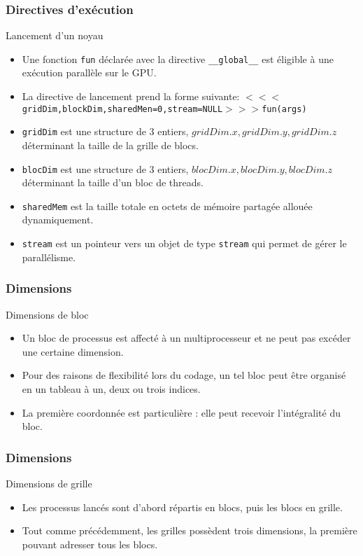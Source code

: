 \begin{frame}
    \frametitle{Directives d'exécution}
\begin{block}{Lancement d'un noyau}
    \footnotesize
    \begin{itemize}
          \item<+-> Une fonction \texttt{fun} déclarée avec la directive \texttt{\_\_global\_\_} est éligible à une exécution parallèle 
  sur le GPU.
  \item<+-> La directive de lancement prend la forme suivante:
{\footnotesize $<<<$\texttt{gridDim,blockDim,sharedMen=0,stream=NULL}$>>>$\texttt{fun(args)}}
 \item<+-> \texttt{gridDim} est une structure de 3 entiers, $gridDim.x,gridDim.y,gridDim.z$ déterminant la taille de la
 grille de blocs.
  \item<+-> \texttt{blocDim} est une structure de 3 entiers, $blocDim.x,blocDim.y,blocDim.z$ déterminant la taille d'un 
  bloc de threads.
  \item<+-> \texttt{sharedMem} est la taille totale en octets de mémoire partagée allouée dynamiquement. 
  \item<+-> \texttt{stream} est un pointeur vers un objet de type \texttt{stream} qui permet de gérer le parallélisme.

\end{itemize}

\end{block}
\end{frame}
\begin{frame}
    \frametitle{Dimensions}
\begin{block}{Dimensions de bloc}
    \begin{itemize}
          \item<+-> Un bloc de processus est affecté à un multiprocesseur et ne peut pas excéder une
          certaine dimension.
          \item<+-> Pour des raisons de flexibilité lors du codage, un tel bloc peut être organisé en 
          un tableau à un, deux ou trois indices. 
          \item<+-> La première coordonnée est particulière : elle peut recevoir l'intégralité du bloc. 
\end{itemize}
\end{block}
\end{frame}
\begin{frame}
    \frametitle{Dimensions}
\begin{block}{Dimensions de grille}
    \begin{itemize}
          \item<+-> Les processus lancés sont d'abord répartis en blocs, puis les blocs en grille.
          \item<+-> Tout comme précédemment, les grilles possèdent trois dimensions, la première pouvant 
          adresser tous les blocs.
\end{itemize}
\end{block}
\end{frame}

